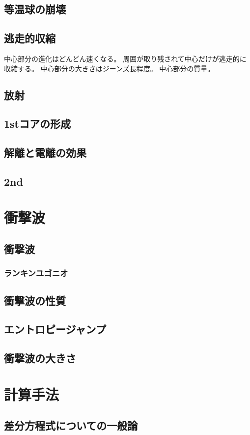 \documentclass{jsarticle}
\begin{document}
\subsection{等温球の崩壊}
\subsection{逃走的収縮}
中心部分の進化はどんどん速くなる。
周囲が取り残されて中心だけが逃走的に収縮する。
中心部分の大きさはジーンズ長程度。
中心部分の質量。
\subsection{放射}
\subsection{1stコアの形成}
\subsection{解離と電離の効果}
\subsection{2nd}
\section{衝撃波}
\subsection{衝撃波}
\subsubsection{ランキンユゴニオ}
\subsection{衝撃波の性質}
\subsection{エントロピージャンプ}
\subsection{衝撃波の大きさ}
\section{計算手法}
\subsection{差分方程式についての一般論}
\end{document}
